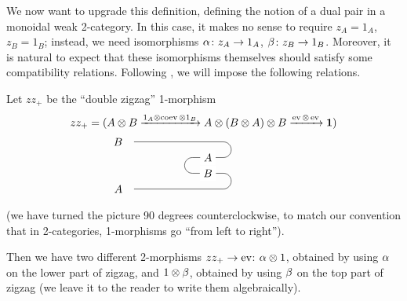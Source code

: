 We now want to upgrade this definition, defining the notion of a dual pair in a
monoidal weak 2-category. In this case, it makes no sense to require $z_A=1_A$,
$z_B=1_B$; instead, we need isomorphisms $\alpha \colon z_A\to 1_A$, $\beta\colon
z_B\to 1_B$. Moreover, it is natural to expect that these isomorphisms
themselves should satisfy some compatibility relations. Following
, we will impose the following relations.

Let $zz_+$ be the ``double zigzag'' 1-morphism
\begin{equation}
  \begin{aligned}
    zz_+&= (A\otimes B \xto{1_A\otimes \coev\otimes 1_B}
            A \otimes (B \otimes A) \otimes B \xto {\ev \otimes \ev}
            \one )\\
    & \qquad
    \begin{tikzpicture}
      \node[label = left:$B$] (B) at (0,0){};
      \node[label = left:$A$] (A) at (0,-1.5){};
      \draw (B)-- +(3,0)  arc (90:-90:0.25)
                                 -- +(-1,0) arc (90:270:0.25)
                                 -- +(1,0) arc(90:-90:0.25)
                                 -- (A);
      \node[fill = white] at (2.5,-0.5) {$A$};
      \node[fill = white] at (2.5,-1) {$B$};
    \end{tikzpicture}
  \end{aligned}
\end{equation}
(we have turned the picture 90 degrees counterclockwise, to match our
convention that in 2-categories, 1-morphisms go ``from left to right'').

Then we have two different 2-morphisms $zz_+\to \operatorname{ev}$: $\alpha\otimes 1$, obtained
by using $\alpha$ on the lower part of zigzag, and $1\otimes \beta$, obtained by using
$\beta$ on the top part of zigzag (we leave it to the reader to write them
algebraically).

